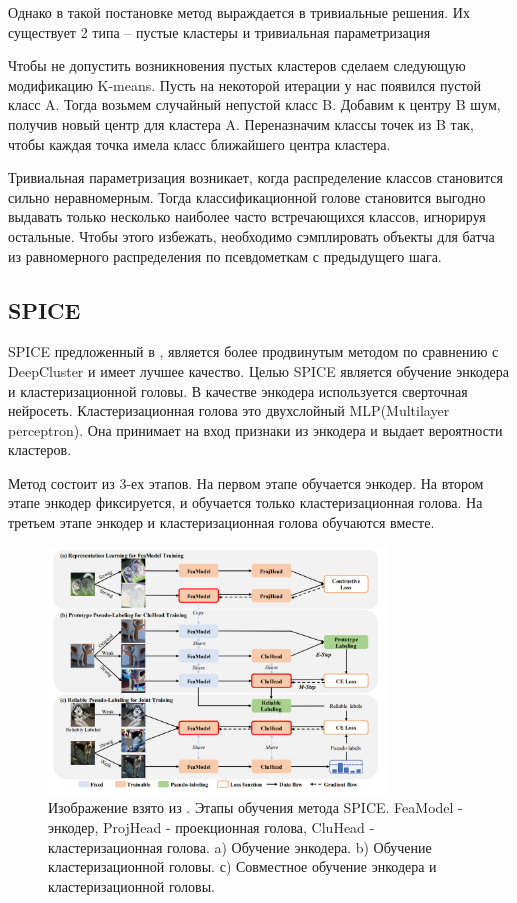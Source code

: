 \documentclass[a4paper,12pt]{extarticle}
\begin{document}
Однако в такой постановке метод выраждается в тривиальные 
решения. Их существует 2 типа -- пустые кластеры и 
тривиальная параметризация

Чтобы не допустить возникновения пустых кластеров 
сделаем следующую модификацию K-means. Пусть 
на некоторой итерации у нас появился пустой 
класс A. Тогда возьмем случайный непустой класс 
B. Добавим к центру B шум, получив новый центр 
для кластера A. Переназначим классы точек из B 
так, чтобы каждая точка имела класс ближайшего 
центра кластера. 

Тривиальная параметризация возникает, когда 
распределение классов становится сильно неравномерным. 
Тогда классификационной голове становится выгодно выдавать 
только несколько наиболее часто встречающихся классов, игнорируя остальные. 
Чтобы этого избежать, необходимо сэмплировать объекты для батча 
из равномерного распределения по псевдометкам с предыдущего шага.

\subsection{SPICE}

SPICE предложенный в \cite{niu2021spice}, является более 
продвинутым методом по сравнению с DeepCluster и имеет лучшее качество.
Целью SPICE является обучение энкодера и кластеризационной головы. 
В качестве энкодера используется сверточная нейросеть.
Кластеризационная голова это двухслойный MLP(Multilayer perceptron). 
Она принимает на вход признаки из энкодера и выдает вероятности 
кластеров.

Метод состоит из 3-ех этапов. На первом этапе обучается энкодер.
На втором этапе энкодер фиксируется, и обучается только кластеризационная
голова. На третьем этапе энкодер и кластеризационная голова обучаются 
вместе. 

\begin{figure}[ht]
	\centering
	\includegraphics[width=0.8\textwidth]{spice.png}
	\caption{Изображение взято из \cite{niu2021spice}. Этапы обучения метода SPICE. 
	FeaModel - энкодер, ProjHead - проекционная голова, CluHead - кластеризационная голова. a) Обучение энкодера. b) Обучение кластеризационной головы.
	с) Совместное обучение энкодера и кластеризационной головы.}
	\label{fig:spice}
\end{figure}
\end{document}
